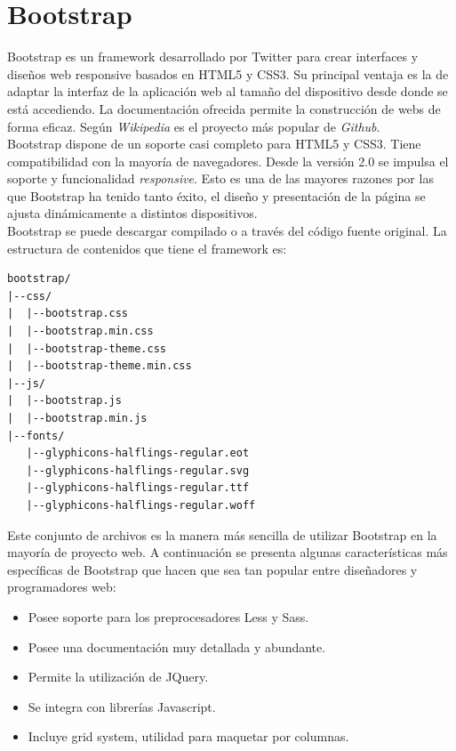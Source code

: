 \documentclass[a4paper, 12pt]{book}
\begin{document}
\section{Bootstrap}
\label{sec:seccion6}
Bootstrap es un framework desarrollado por Twitter para crear interfaces y diseños web responsive
basados en HTML5 y CSS3. Su principal ventaja es la de adaptar la interfaz de la aplicación web
al tamaño del dispositivo desde donde se está accediendo. La documentación ofrecida permite la
construcción de webs de forma eficaz. Según \emph{Wikipedia} es el proyecto más popular de
\emph{Github}. \\

Bootstrap dispone de un soporte casi completo para HTML5 y CSS3. Tiene compatibilidad con la mayoría
de navegadores. Desde la versión 2.0 se impulsa el soporte y funcionalidad \emph{responsive}. Esto
es una de las mayores razones por las que Bootstrap ha tenido tanto éxito, el diseño y presentación
de la página se ajusta dinámicamente a distintos dispositivos. \\

Bootstrap se puede descargar compilado o a través del código fuente original. La estructura de 
contenidos que tiene el framework es:

\begingroup
\fontsize{9pt}{10pt}\selectfont
\begin{verbatim}
bootstrap/
|--css/
|  |--bootstrap.css
|  |--bootstrap.min.css
|  |--bootstrap-theme.css
|  |--bootstrap-theme.min.css
|--js/
|  |--bootstrap.js
|  |--bootstrap.min.js
|--fonts/
   |--glyphicons-halflings-regular.eot
   |--glyphicons-halflings-regular.svg
   |--glyphicons-halflings-regular.ttf
   |--glyphicons-halflings-regular.woff
\end{verbatim}
\endgroup

Este conjunto de archivos es la manera más sencilla de utilizar Bootstrap en la mayoría 
de proyecto web. A continuación se presenta algunas características más específicas 
de Bootstrap que hacen que sea tan popular entre diseñadores y programadores web:

\begin{itemize}
  \item Posee soporte para los preprocesadores Less y Sass.
	\item Posee una documentación muy detallada y abundante.
	\item Permite la utilización de JQuery.
	\item Se integra con librerías Javascript.
	\item Incluye grid system, utilidad para maquetar por columnas.
	
\end{itemize}
\end{document}
